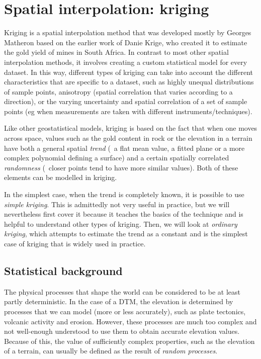 
\setchapterpreamble[u]{\margintoc}


\graphicspath{{kriging/}}

\chapter{Spatial interpolation: kriging}%
\label{chap:kriging}


Kriging is a spatial interpolation method that was developed mostly by Georges Matheron based on the earlier work of Danie Krige, who created it to estimate the gold yield of mines in South Africa.
In contrast to most other spatial interpolation methods, it involves creating a custom statistical model for every dataset.
In this way, different types of kriging can take into account the different characteristics that are specific to a dataset, such as highly unequal distributions of sample points, anisotropy (spatial correlation that varies according to a direction), or the varying uncertainty and spatial correlation of a set of sample points (eg when measurements are taken with different instruments/techniques).

Like other geostatistical models, kriging is based on the fact that when one moves across space, values such as the gold content in rock or the elevation in a terrain have both a general spatial \emph{trend} (\eg\ a flat mean value, a fitted plane or a more complex polynomial defining a surface) and a certain spatially correlated \emph{randomness} (\ie\ closer points tend to have more similar values).
Both of these elements can be modelled in kriging.

In the simplest case, when the trend is completely known, it is possible to use \emph{simple kriging}.
This is admittedly not very useful in practice, but we will nevertheless first cover it because it teaches the basics of the technique and is helpful to understand other types of kriging.
Then, we will look at \emph{ordinary kriging}, which attempts to estimate the trend as a constant and is the simplest case of kriging that is widely used in practice.

\section{Statistical background}

The physical processes that shape the world can be considered to be at least partly deterministic.
In the case of a DTM, the elevation is determined by processes that we can model (more or less accurately), such as plate tectonics, volcanic activity and erosion.
However, these processes are much too complex and not well-enough understood to use them to obtain accurate elevation values.
Because of this, the value of sufficiently complex properties, such as the elevation of a terrain, can usually be defined as the result of \emph{random processes}.

